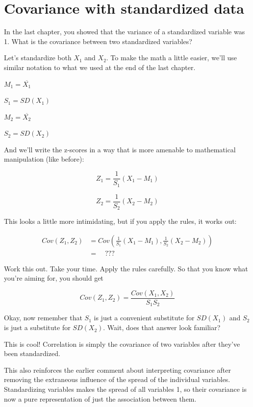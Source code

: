 \documentclass[
]{book}
\begin{document}
\hypertarget{covariance-standardized}{%
\section{Covariance with standardized data}\label{covariance-standardized}}

In the last chapter, you showed that the variance of a standardized variable was 1. What is the covariance between two standardized variables?

Let's standardize both \(X_{1}\) and \(X_{2}\). To make the math a little easier, we'll use similar notation to what we used at the end of the last chapter.

\(M_{1} = \overline{X_{1}}\)

\(S_{1} = SD(X_{1})\)

\(M_{2} = \overline{X_{2}}\)

\(S_{2} = SD(X_{2})\)

And we'll write the z-scores in a way that is more amenable to mathematical manipulation (like before):

\[
Z_{1} = \frac{1}{S_{1}}\left(X_{1} - M_{1}\right)
\]

\[
Z_{2} = \frac{1}{S_{2}}\left(X_{2} - M_{2}\right)
\]

This looks a little more intimidating, but if you apply the rules, it works out:

\begin{align}
Cov(Z_{1}, Z_{2}) &= Cov\left( \frac{1}{S_{1}}\left(X_{1} - M_{1}\right), \frac{1}{S_{2}}\left(X_{2} - M_{2}\right) \right) \\
    &= \quad ???
\end{align}

Work this out. Take your time. Apply the rules carefully. So that you know what you're aiming for, you should get

\[
Cov(Z_{1}, Z_{2}) = \frac{Cov\left( X_{1}, X_{2} \right)}{S_{1} S_{2}}
\]

Okay, now remember that \(S_{1}\) is just a convenient substitute for \(SD(X_{1})\) and \(S_{2}\) is just a substitute for \(SD(X_{2})\). Wait, does that answer look familiar?

This is cool! Correlation is simply the covariance of two variables after they've been standardized.

This also reinforces the earlier comment about interpreting covariance after removing the extraneous influence of the spread of the individual variables. Standardizing variables makes the spread of all variables 1, so their covariance is now a pure representation of just the association between them.
\end{document}
